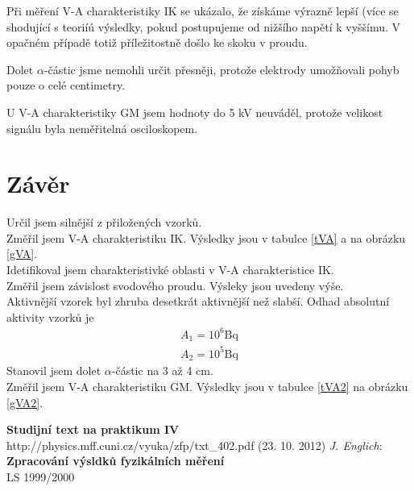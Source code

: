 \documentclass[a4paper,12pt]{article}
\begin{document}
Při měření V-A charakteristiky IK se ukázalo, že získáme výrazně lepší 
(více se shodující s teoriíú výsledky, pokud postupujeme od nižšího napětí k vyššímu. V opačném případě totiž příležitostně došlo ke skoku v proudu.

Dolet $\alpha$-částic jsme nemohli určit přesněji, protože elektrody umožňovali pohyb pouze o celé centimetry.

U V-A charakteristiky GM jsem hodnoty do 5 kV neuváděl, protože velikost signálu byla neměřitelná osciloskopem.


\section{Závěr}
Určil jsem silnější z přiložených vzorků. \\
Změřil jsem V-A charakteristiku IK. Výsledky jsou v tabulce \ref{tVA} a na obrázku \ref{gVA}. \\
Idetifikoval jsem charakteristivké oblasti v V-A charakteristice IK. \\
Změřil jsem závislost svodového proudu. Výsleky jsou uvedeny výše. \\
Aktivnější vzorek byl zhruba desetkrát aktivnější než slabší. Odhad absolutní aktivity vzorků je
\begin{eqnarray}
A_1=10^6 \mbox{Bq} \\
A_2=10^5 \mbox{Bq}
\end{eqnarray}
Stanovil jsem dolet $\alpha$-částic na 3 až 4 cm. \\
Změřil jsem V-A charakteristiku GM. Výsledky jsou v tabulce \ref{tVA2} na obrázku \ref{gVA2}.

\begin{thebibliography}{5}
	 \textbf{Studijní text na praktikum IV} \\http://physics.mff.cuni.cz/vyuka/zfp/txt\_402.pdf (23. 10. 2012)
     \emph{J. Englich}: \textbf{Zpracování výsldků fyzikálních měření} \\ LS 1999/2000
\end{thebibliography}
\end{document}
